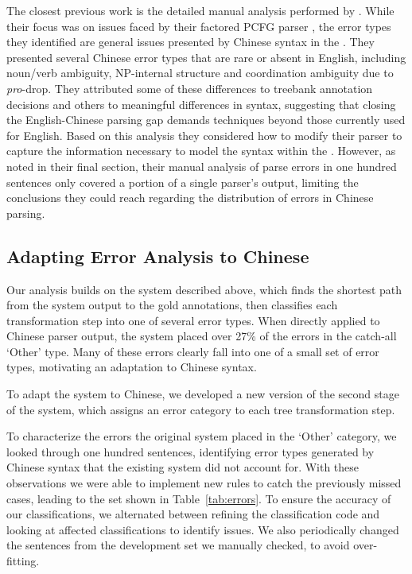 The closest previous work is the detailed manual analysis performed by \textcite{Levy-Manning:2003:ACL}.
While their focus was on issues faced by their factored PCFG parser \parencite{Klein-Manning:2003:NIPS}, the error types they identified are general issues presented by Chinese syntax in the \pctb.
They presented several Chinese error types that are rare or absent in English, including noun/verb ambiguity, NP-internal structure and coordination ambiguity due to \emph{pro}-drop.
They attributed some of these differences to treebank annotation decisions and others to meaningful differences in syntax, suggesting that closing the English-Chinese parsing gap demands techniques beyond those currently used for English.
Based on this analysis they considered how to modify their parser to capture the information necessary to model the syntax within the \pctb.
However, as noted in their final section, their manual analysis of parse errors in one hundred sentences only covered a portion of a single parser's output, limiting the conclusions they could reach regarding the distribution of errors in Chinese parsing.

\subsection{Adapting Error Analysis to Chinese} \label{sec:adapting_automatic_error_analysis_to_chinese}

Our analysis builds on the system described above, which finds the shortest path from the system output to the gold annotations, then classifies each transformation step into one of several error types.
When directly applied to Chinese parser output, the system placed over 27\% of the errors in the catch-all `Other' type.
Many of these errors clearly fall into one of a small set of error types, motivating an adaptation to Chinese syntax.

To adapt the system to Chinese, we developed a new version of the second stage of the system, which assigns an error category to each tree transformation step.

To characterize the errors the original system placed in the `Other' category,
we looked through one hundred sentences, identifying error types generated by
Chinese syntax that the existing system did not account for.
With these observations we were able to implement new rules to catch the
previously missed cases, leading to the set shown in Table~\ref{tab:errors}.
To ensure the accuracy of our classifications, we alternated between refining
the classification code and looking at affected classifications to identify
issues.  We also periodically changed the sentences from the development set
we manually checked, to avoid over-fitting.

